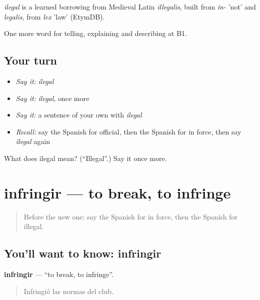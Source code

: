 \begin{cousinweb}
\emph{ilegal} is a learned borrowing from Medieval Latin \emph{illegalis}, built from \emph{in-} 'not' and \emph{legalis}, from \emph{lex} 'law' (EtymDB).
\end{cousinweb}

\begin{grammarlens}[title={What you've built}]
One more word for telling, explaining and describing at B1.
\end{grammarlens}

\subsection*{Your turn}
\begin{itemize}
\raggedright
  \item \emph{Say it:} \emph{ilegal}
  \item \emph{Say it:} \emph{ilegal}, once more
  \item \emph{Say it:} a sentence of your own with \emph{ilegal}
  \item \emph{Recall:} say the Spanish for official, then the Spanish for in force, then say \emph{ilegal} again
\end{itemize}

\begin{tcolorbox}[breakable,colback=teal!4,colframe=teal!35!black,title={Before you move on}]
What does ilegal mean? (\textquotedblleft{}Illegal\textquotedblright{}.) Say it once more.
\end{tcolorbox}
\section[infringir]{infringir — to break, to infringe}

\label{lesson:ES-C625-infringir}



\begin{quote}
Before the new one: say the Spanish for in force, then the Spanish for illegal.
\end{quote}

\subsection*{You'll want to know: infringir}
\textbf{infringir} — \textquotedblleft{}to break, to infringe\textquotedblright{}.

\begin{quote}
Infringió las normas del club.
\end{quote}


